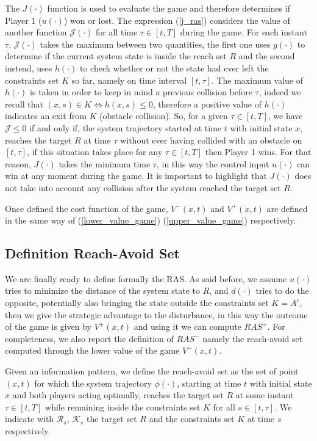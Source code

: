 The $J(\cdot)$ function is used to evaluate the game and therefore determines if Player 1 ($u(\cdot)$) won or lost. The expression (\ref{j_ras}) considers the value of another function $\mathcal{J}(\cdot)$ for all time $\tau \in [t, T]$ during the game. For each instant $\tau$, $\mathcal{J}(\cdot)$ takes the maximum between two quantities, the first one uses $g(\cdot)$ to determine if the current system state is inside the reach set $R$ and the second instead, uses $h(\cdot)$ to check whether or not the state had ever left the constraints set $K$ so far, namely on time interval $[t, \tau]$. The maximum value of $h(\cdot)$ is taken in order to keep in mind a previous collision before $\tau$, indeed we recall that $(x,s) \in K \Leftrightarrow h(x,s) \leq 0$, therefore a positive value of $h(\cdot)$ indicates an exit from $K$ (obstacle collision).
So, for a given $\tau \in [t, T]$, we have $\mathcal{J} \leq 0$ if and only if, the system trajectory started at time $t$ with initial state $x$, reaches the target $R$ at time $\tau$ without ever having collided with an obstacle on $[t, \tau]$, if this situation takes place for any $\tau \in [t, T]$ then Player 1 wins. For that reason, $J(\cdot)$ takes the minimum time $\tau$, in this way the control input $u(\cdot)$ can win at any moment during the game. It is important to highlight that $J(\cdot)$ does not take into account any collision after the system reached the target set $R$. 

Once defined the cost function of the game, $V^-(x,t)$ and $V^+(x,t)$ are defined in the same way of (\ref{lower_value_game}) (\ref{upper_value_game}) respectively.

\subsection{Definition Reach-Avoid Set}
We are finally ready to define formally the RAS. As said before, we assume $u(\cdot)$ tries to minimize the distance of the system state to $R$, and $d(\cdot)$ tries to do the opposite, potentially also bringing the state outside the constraints set $K=A^c$, then we give the strategic advantage to the disturbance, in this way the outcome of the game is given by $V^+(x,t)$ and using it we can compute $RAS^+$. For completeness, we also report the definition of $RAS^-$ namely the reach-avoid set computed through the lower value of the game $V^-(x,t)$.

Given an information pattern, we define the reach-avoid set as the set of point $(x,t)$ for which the system trajectory $\phi(\cdot)$, starting at time $t$ with initial state $x$ and both players acting optimally, reaches the target set $R$ at some instant $\tau \in [t, T]$ while remaining inside the constraints set $K$ for all $s \in [t, \tau]$. We indicate with $\mathcal{R}_s$, $\mathcal{K}_s$ the target set $R$ and the constraints set $K$ at time $s$ respectively.

